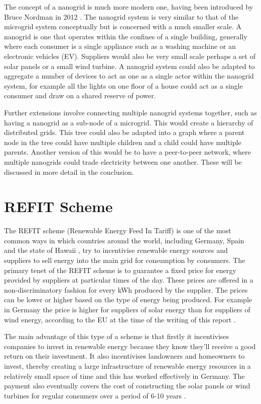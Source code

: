\documentclass[a4paper, notitlepage]{report}
\begin{document}
The concept of a nanogrid is much more modern one, having been introduced
by Bruce Nordman in 2012 \cite{nordman2012think}. The nanogrid system is very
similar to that of the microgrid system conceptually but is concerned with a
much smaller scale. A nanogrid is one that operates within the confines of a
single building, generally where each consumer is a single appliance such as a
washing machine or an electronic vehicles (EV). Suppliers would also be very
small scale perhaps a set of solar panels or a small wind turbine. A nanogrid
system could also be adapted to aggregate a number of devices to act as one as a
single actor within the nanogrid system, for example all the lights on one floor
of a house could act as a single consumer and draw on a shared reserve of power.

Further extensions involve connecting multiple nanogrid systems together, such
as having a nanogrid as a sub-node of a microgrid. This would create a hierarchy
of distributed grids. This tree could also be adapted into a graph where a
parent node in the tree could have multiple children and a child could have
multiple parents. Another version of this would be to have a peer-to-peer
network, where multiple nanogrids could trade electricity between one another.
These will be discussed in more detail in the conclusion.
\chapter{REFIT Scheme}
\label{sec:org89d84ad}
The REFIT scheme (Renewable Energy Feed In Tariff) \cite{lauber2004refit} is one of the most common
ways in which countries around the world, including Germany, Spain and the state
of Hawaii \cite{couture2010analysis}, try to incentivise renewable energy sources
and suppliers to sell energy into the main grid for consumption by consumers.
The primary tenet of the REFIT scheme is to guarantee a fixed price for energy
provided by suppliers at particular times of the day. These prices are offered
in a non-discriminatory fashion for every kWh produced by the supplier. The
prices can be lower or higher based on the type of energy being produced. For
example in Germany the price is higher for suppliers of solar energy than for
suppliers of wind energy, according to the EU at the time of the writing of this
report \cite{refit_germany}.

The main advantage of this type of a scheme is that firstly it incentivises
companies to invest in renewable energy because they know they’ll receive a good
return on their investment. It also incentivises landowners and homeowners to
invest, thereby creating a large infrastructure of renewable energy resources in
a relatively small space of time and this has worked effectively in Germany. The
payment also eventually covers the cost of constructing the solar panels or wind
turbines for regular consumers over a period of 6-10 years \cite{lauber2004refit}. 
\end{document}
